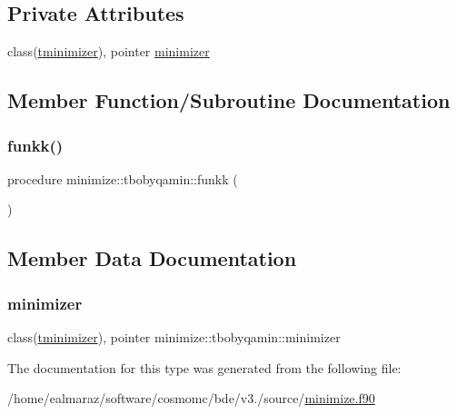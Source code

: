 \subsection*{Private Attributes}
\begin{DoxyCompactItemize}
\item 
class(\mbox{\hyperlink{structminimize_1_1tminimizer}{tminimizer}}), pointer \mbox{\hyperlink{structminimize_1_1tbobyqamin_aaea116a1b4b9b7c22edd62088f2eee1e}{minimizer}}
\end{DoxyCompactItemize}


\subsection{Member Function/\+Subroutine Documentation}
\mbox{\label{structminimize_1_1tbobyqamin_ab1e5d7426942d9218b05cf91e0e8e337}} 
\subsubsection{\texorpdfstring{funkk()}{funkk()}}
{\footnotesize\ttfamily procedure minimize\+::tbobyqamin\+::funkk (\begin{DoxyParamCaption}{ }\end{DoxyParamCaption})\hspace{0.3cm}{\ttfamily [private]}}



\subsection{Member Data Documentation}
\mbox{\label{structminimize_1_1tbobyqamin_aaea116a1b4b9b7c22edd62088f2eee1e}} 
\subsubsection{\texorpdfstring{minimizer}{minimizer}}
{\footnotesize\ttfamily class(\mbox{\hyperlink{structminimize_1_1tminimizer}{tminimizer}}), pointer minimize\+::tbobyqamin\+::minimizer\hspace{0.3cm}{\ttfamily [private]}}



The documentation for this type was generated from the following file\+:\begin{DoxyCompactItemize}
\item 
/home/ealmaraz/software/cosmomc/bde/v3./source/\mbox{\hyperlink{minimize_8f90}{minimize.\+f90}}\end{DoxyCompactItemize}
